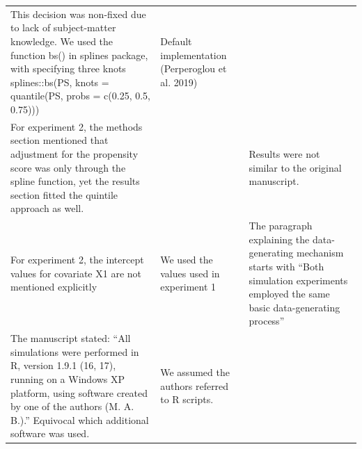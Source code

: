 \documentclass[10,a4paperpaper,]{article}
\begin{document}
\begin{longtable}[]{@{}lll@{}}
\begin{minipage}[t]{0.33\columnwidth}
This decision was non-fixed due to lack of subject-matter knowledge. We
used the function bs() in splines package, with specifying three knots
splines::bs(PS, knots = quantile(PS, probs = c(0.25, 0.5, 0.75)))\strut
\end{minipage} & \begin{minipage}[t]{0.25\columnwidth}\raggedright
Default implementation (Perperoglou et al. 2019)\strut
\end{minipage}\tabularnewline
\begin{minipage}[t]{0.33\columnwidth}\raggedright
For experiment 2, the methods section mentioned that adjustment for the
propensity score was only through the spline function, yet the results
section fitted the quintile approach as well.\strut
\end{minipage} & \begin{minipage}[t]{0.33\columnwidth}\raggedright
\strut
\end{minipage} & \begin{minipage}[t]{0.25\columnwidth}\raggedright
Results were not similar to the original manuscript.\strut
\end{minipage}\tabularnewline
\begin{minipage}[t]{0.33\columnwidth}\raggedright
For experiment 2, the intercept values for covariate X1 are not
mentioned explicitly\strut
\end{minipage} & \begin{minipage}[t]{0.33\columnwidth}\raggedright
We used the values used in experiment 1\strut
\end{minipage} & \begin{minipage}[t]{0.25\columnwidth}\raggedright
The paragraph explaining the data-generating mechanism starts with
``Both simulation experiments employed the same basic data-generating
process''\strut
\end{minipage}\tabularnewline
\begin{minipage}[t]{0.33\columnwidth}\raggedright
The manuscript stated: ``All simulations were performed in R, version
1.9.1 (16, 17), running on a Windows XP platform, using software created
by one of the authors (M. A. B.).'' Equivocal which additional software
was used.\strut
\end{minipage} & \begin{minipage}[t]{0.33\columnwidth}\raggedright
We assumed the authors referred to R scripts.\strut
\end{minipage} & \begin{minipage}[t]{0.25\columnwidth}\raggedright

\end{minipage}
\end{longtable}
\end{document}
